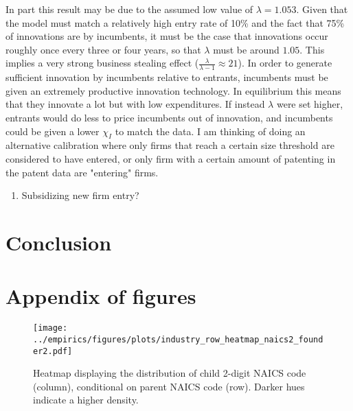 \documentclass[12pt,english]{article}
\theoremstyle{remark}
\begin{document}
In part this result may be due to the assumed low value of $\lambda = 1.053$. Given that the model must match a relatively high entry rate of 10\% and the fact that 75\% of innovations are by incumbents, it must be the case that innovations occur roughly once every three or four years, so that $\lambda$ must be around $1.05$. This implies a very strong business stealing effect ($\frac{\lambda}{\lambda - 1} \approx 21$). In order to generate sufficient innovation by incumbents relative to entrants, incumbents must be given an extremely productive innovation technology. In equilibrium this means that they innovate a lot but with low expenditures. If instead $\lambda$ were set higher, entrants would do less to price incumbents out of innovation, and incumbents could be given a lower $\chi_I$ to match the data. I am thinking of doing an alternative calibration where only firms that reach a certain size threshold are considered to have entered, or only firm with a certain amount of patenting in the patent data are "entering" firms.

\begin{enumerate}
	\item Subsidizing new firm entry?
\end{enumerate}

\section{Conclusion}










\appendix




\pagebreak

\section{Appendix of figures}


\begin{figure}[!htb]
	\centering
	\texttt{[image: ../empirics/figures/plots/industry\_row\_heatmap\_naics2\_founder2.pdf]}
	\caption{Heatmap displaying the distribution of child 2-digit NAICS code (column), conditional on parent NAICS code (row). Darker hues indicate a higher density.}
	\label{figure:industry_row_heatmap_naics2_founder2}
\end{figure}
\end{document}
